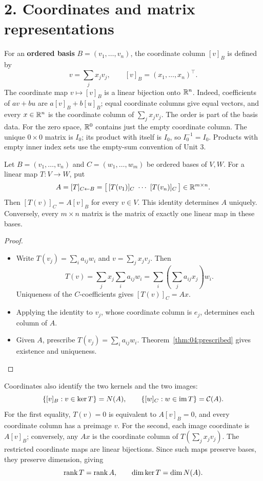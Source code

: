 \section*{2. Coordinates and matrix representations}

For an \textbf{ordered basis}
\(B=(v_1,\ldots,v_n)\), the coordinate column \([v]_B\) is defined by
\[
v=\sum_jx_jv_j,\qquad [v]_B=(x_1,\ldots,x_n)^\top.
\]
The coordinate map \(v\mapsto[v]_B\) is a linear bijection onto \(\mathbb R^n\).
Indeed, coefficients of \(av+bu\) are \(a[v]_B+b[u]_B\);
equal coordinate columns give equal vectors, and every \(x\in\mathbb R^n\)
is the coordinate column of \(\sum_jx_jv_j\).
The order is part of the basis data.
For the zero space, \(\mathbb R^0\) contains just the empty coordinate column.
The unique \(0\times0\) matrix is \(I_0\); its product with itself is
\(I_0\), so \(I_0^{-1}=I_0\). Products with empty inner index sets use
the empty-sum convention of Unit 3.

\begin{theorem}\label{thm:04:representation}
Let \(B=(v_1,\ldots,v_n)\) and \(C=(w_1,\ldots,w_m)\) be ordered bases
of \(V,W\). For a linear map \(T:V\to W\), put
\[
A=[T]_{C\leftarrow B}
 =\bigl[\,[T(v_1)]_C\ \cdots\ [T(v_n)]_C\,\bigr]\in\mathbb R^{m\times n}.
\]
Then \([T(v)]_C=A[v]_B\) for every \(v\in V\).
This identity determines \(A\) uniquely.
Conversely, every \(m\times n\) matrix is the matrix of exactly one
linear map in these bases.
\end{theorem}
\begin{proof}
\begin{itemize}
\item Write \(T(v_j)=\sum_i a_{ij}w_i\) and \(v=\sum_jx_jv_j\). Then
  \[
  T(v)=\sum_jx_j\sum_i a_{ij}w_i
  =\sum_i\left(\sum_j a_{ij}x_j\right)w_i.
  \]
  Uniqueness of the \(C\)-coefficients gives \([T(v)]_C=Ax\).
\item Applying the identity to \(v_j\), whose coordinate column is \(e_j\),
  determines each column of \(A\).
\item Given \(A\), prescribe \(T(v_j)=\sum_i a_{ij}w_i\).
  Theorem~\ref{thm:04:prescribed} gives existence and uniqueness.
\end{itemize}
\end{proof}

Coordinates also identify the two
kernels and the two images:
\[
\{[v]_B:v\in\ker T\}=N(A),\qquad
\{[w]_C:w\in\operatorname{im} T\}=\mathcal C(A).
\]
For the first equality, \(T(v)=0\) is equivalent to \(A[v]_B=0\),
and every coordinate column has a preimage \(v\).
For the second, each image coordinate is \(A[v]_B\); conversely,
any \(Ax\) is the coordinate column of \(T(\sum_jx_jv_j)\).
The restricted coordinate maps are linear bijections. Since such maps
preserve bases, they preserve dimension, giving
\[
\operatorname{rank} T=\operatorname{rank} A,\qquad \dim\ker T=\dim N(A).
\]

